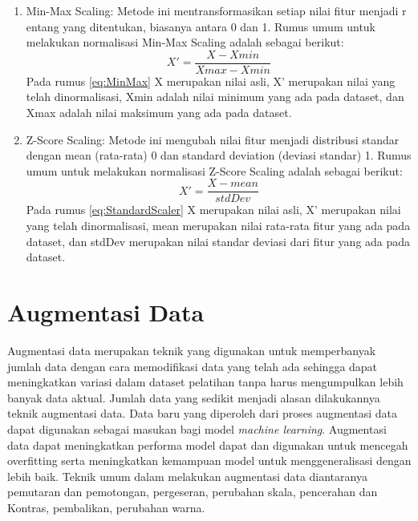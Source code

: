 \begin{enumerate}[nolistsep]
  \item Min-Max Scaling: Metode ini mentransformasikan setiap nilai fitur menjadi r
        entang yang ditentukan, biasanya antara 0 dan 1. Rumus umum untuk melakukan
        normalisasi Min-Max Scaling adalah sebagai berikut:
        \begin{equation}
          \label{eq:MinMax}
          X' = \frac{X - Xmin}{Xmax - Xmin}
        \end{equation}
        Pada rumus \ref{eq:MinMax} X merupakan nilai asli, X' merupakan nilai yang telah
        dinormalisasi, Xmin adalah nilai minimum yang ada pada dataset, dan Xmax adalah nilai
        maksimum yang ada pada dataset.

  \item Z-Score Scaling: Metode ini mengubah nilai fitur menjadi distribusi standar
        dengan mean (rata-rata) 0 dan standard deviation (deviasi standar) 1. Rumus umum
        untuk melakukan normalisasi Z-Score Scaling adalah sebagai berikut:
        \begin{equation}
          \label{eq:StandardScaler}
          X' = \frac{X - mean}{stdDev}
        \end{equation}
        Pada rumus \ref{eq:StandardScaler} X merupakan nilai asli, X' merupakan nilai yang telah
        dinormalisasi, mean merupakan nilai rata-rata fitur yang ada pada dataset, dan stdDev
        merupakan nilai standar deviasi dari fitur yang ada pada dataset.
\end{enumerate}

\section{Augmentasi Data}
Augmentasi data merupakan teknik yang digunakan untuk memperbanyak jumlah data dengan
cara memodifikasi data yang telah ada sehingga dapat meningkatkan variasi dalam dataset
pelatihan tanpa harus mengumpulkan lebih banyak data aktual. Jumlah data yang sedikit menjadi alasan dilakukannya
teknik augmentasi data. Data baru yang diperoleh dari proses augmentasi data dapat digunakan
sebagai masukan bagi model \emph{machine learning}. Augmentasi data dapat meningkatkan
performa model dapat dan digunakan untuk mencegah overfitting serta meningkatkan kemampuan
model untuk menggeneralisasi dengan lebih baik. Teknik umum dalam melakukan augmentasi data
diantaranya pemutaran dan pemotongan, pergeseran, perubahan skala, pencerahan dan Kontras,
pembalikan, perubahan warna. \parencite{30}

